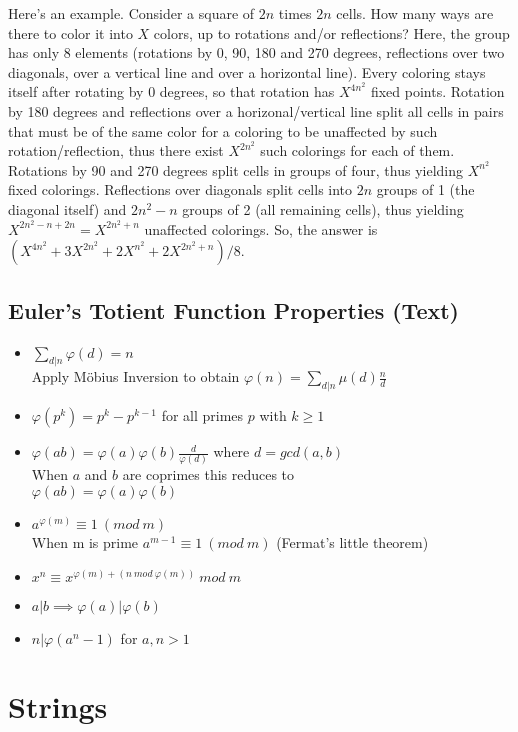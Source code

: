 \documentclass[9pt]{extarticle}
\begin{document}
\begin{multicols*}{3}
Here's an example. Consider a square of $2n$ times $2n$ cells. How many ways
are there to color it into $X$ colors, up to rotations and/or reflections?
Here, the group has only 8 elements (rotations by 0, 90, 180 and 270 degrees,
reflections over two diagonals, over a vertical line and over a horizontal
line). Every coloring stays itself after rotating by 0 degrees, so that
rotation has $X^{4n^2}$ fixed points. Rotation by 180 degrees and reflections
over a horizonal/vertical line split all cells in pairs that must be of the
same color for a coloring to be unaffected by such rotation/reflection, thus
there exist $X^{2n^2}$ such colorings for each of them. Rotations by 90 and 270
degrees split cells in groups of four, thus yielding $X^{n^2}$ fixed colorings.
Reflections over diagonals split cells into $2n$ groups of 1 (the diagonal
itself) and $2n^2-n$ groups of 2 (all remaining cells), thus yielding
$X^{2n^2-n+2n}=X^{2n^2+n}$ unaffected colorings.  So, the answer is
$(X^{4n^2}+3X^{2n^2}+2X^{n^2}+2X^{2n^2+n})/8$.

\subsection{Euler's Totient Function Properties (Text)}
\begin{itemize}
\item $\displaystyle \sum_{d|n} \varphi(d) = n$ \\
Apply M\"obius Inversion to obtain $\displaystyle \varphi(n) = \sum_{d|n} \mu(d)\frac{n}{d}$
\item $\varphi(p^k) = p^k - p^{k-1}$ for all primes $p$ with $k \geq 1$
\item $\varphi(ab) = \varphi(a)\varphi(b)\frac{d}{\varphi(d)}$ where $d = gcd(a, b)$ \\
When $a$ and $b$ are coprimes this reduces to \\
$\varphi(ab) = \varphi(a)\varphi(b)$
\item $a^{\varphi(m)} \equiv 1 \ (mod \ m)$ \\
When m is prime $a^{m-1} \equiv 1 \ (mod \ m)$ (Fermat's little theorem)
\item $x^n \equiv x^{\varphi(m) + (n \ mod \ \varphi(m))} \ mod \ m$
\item $a | b \implies \varphi(a) | \varphi(b)$
\item $n | \varphi(a^n - 1)$ for $a, n > 1$
\end{itemize}

\section{Strings}


\end{multicols*}
\end{document}
